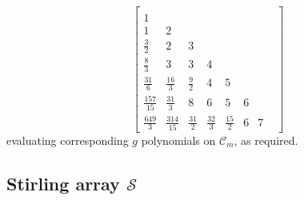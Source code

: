 \begin{displaymath}
\left[\begin{matrix}  &   &   &   &   &   &   &  \\1 &   &   &   &   &   &   &  \\1 & 2 &   &   &   &   &   &  \\\frac{3}{2} & 2 & 3 &   &   &   &   &  \\\frac{8}{3} & 3 & 3 & 4 &   &   &   &  \\\frac{31}{6} & \frac{16}{3} & \frac{9}{2} & 4 & 5 &   &   &  \\\frac{157}{15} & \frac{31}{3} & 8 & 6 & 5 & 6 &   &  \\\frac{649}{3 } & \frac{314}{15} & \frac{31}{2} & \frac{32}{3} & \frac{15}{2} & 6 & 7 &  \end{matrix}\right]
\end{displaymath}
evaluating corresponding $g$ polynomials on $\mathcal{C}_{m}$, as required.

\subsection{Stirling array $\mathcal{S}$}

